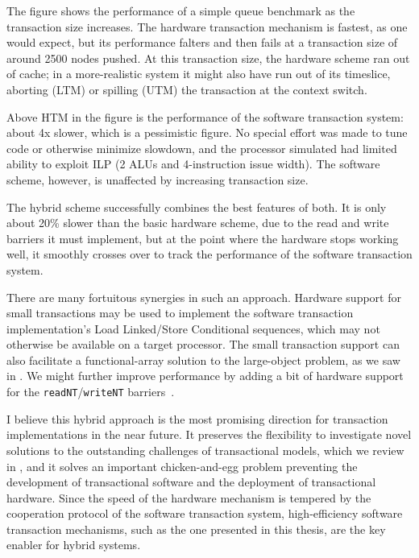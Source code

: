 The figure shows the performance of a simple queue benchmark as the
transaction size increases.  The hardware transaction mechanism is
fastest, as one would expect, but its performance falters and then
fails at a transaction size of around 2500 nodes pushed.  At this
transaction size, the hardware scheme ran out of cache; in a
more-realistic system it might also have run out of its timeslice,
aborting (LTM) or spilling (UTM) the transaction at the context
switch.

Above HTM in the figure is the performance of the software transaction
system: about 4x slower, which is a pessimistic figure.  No
special effort was made to tune code or otherwise minimize slowdown,
and the processor simulated had limited ability to exploit ILP (2 ALUs
and 4-instruction issue width).  The software scheme, however, is unaffected by
increasing transaction size.

The hybrid scheme successfully combines the best features of both.  It
is only about 20\% slower than the basic hardware scheme, due to the
read and write barriers it must implement, but at the point where the
hardware stops working well, it smoothly crosses over to track the
performance of the software transaction system.

There are many fortuitous synergies in such an approach.  
Hardware support for small transactions may
be used to implement the software transaction implementation's
Load Linked/Store Conditional sequences, which may not
otherwise be available on a target processor.
The small transaction support can also facilitate a functional-array
solution to the large-object problem, as we saw in
.  We might further improve performance by adding a
bit of hardware support for the \texttt{readNT}/\texttt{writeNT}
barriers~\cite{ClickTeWo05}.

I believe this hybrid approach is the most promising direction for
transaction implementations in the near future.  It preserves the
flexibility to investigate novel solutions to the outstanding challenges of
transactional models, which we review in , and it
solves an important chicken-and-egg problem preventing the development
of transactional software and the deployment of transactional
hardware.  Since the speed of the hardware mechanism is tempered by
the cooperation protocol of the software transaction system,
high-efficiency software transaction mechanisms, such as the one
presented in this thesis, are the key enabler for hybrid systems.
